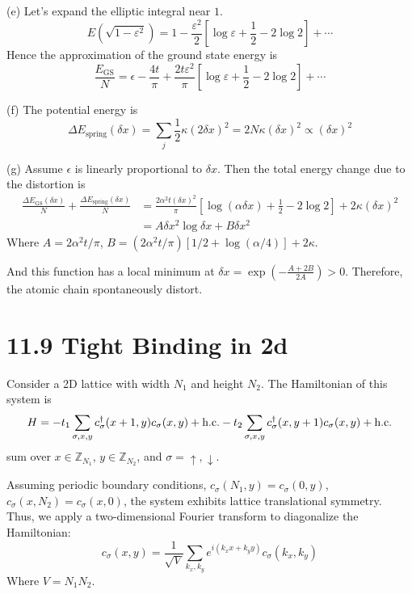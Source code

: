 \documentclass[a4paper,11pt]{article}
\begin{document}
(e) Let's expand the elliptic integral near $1$. 
\begin{equation}
    E\left(\sqrt{1-\varepsilon^2}\right)=1-\frac{\varepsilon^2}{2}\left[\log \varepsilon+\frac{1}{2}-2\log 2\right] + \cdots
\end{equation}
Hence the approximation of the ground state energy is
\begin{equation}
     \frac{E_\text{GS}}{N}=\epsilon-\frac{4t}{\pi}+\frac{2t\varepsilon^2}{\pi}\left[\log \varepsilon+\frac{1}{2}-2\log 2\right] + \cdots
\end{equation}


(f) The potential energy is 
\begin{equation}
    \Delta E_\text{spring}(\delta x)=\sum_{j} \frac{1}{2} \kappa(2\delta x)^2=2N\kappa(\delta x)^2\propto (\delta x)^2
\end{equation}

(g) Assume $\epsilon$ is linearly proportional to $\delta x$.
Then the total energy change due to the distortion is
\begin{align}
    \frac{\Delta E_\text{GS}(\delta x)}{N} + \frac{\Delta E_\text{spring}(\delta x)}{N} 
    &= \frac{2\alpha ^2t(\delta x)^2}{\pi}\left[\log (\alpha\delta x)+\frac{1}{2}-2\log 2\right] + 2\kappa (\delta x)^2 \\
    &=A\delta x^2\log\delta x + B\delta x^2
\end{align}
Where $A=2\alpha^2 t/\pi$, $B=(2\alpha^2 t/\pi)[1/2 +\log (\alpha/4)] + 2\kappa$.

And this function has a local minimum at $\delta x=\exp\left(-\frac{A+2B}{2A}\right) > 0$. Therefore, the atomic chain spontaneously distort.




\section{11.9 Tight Binding in 2d}



Consider a 2D lattice with width $N_1$ and height $N_2$. The Hamiltonian of this system is
\begin{equation}
    H=-t_1\sum_{\sigma, x, y}c_\sigma^\dagger(x + 1, y)c_\sigma(x, y)+\text{h.c.}-t_2\sum_{\sigma, x, y}c_\sigma^\dagger(x, y+1)c_\sigma(x, y)+\text{h.c.} 
\end{equation}
sum over $x\in \mathbb Z_{N_1}$, $y\in \mathbb Z_{N_2}$, and $\sigma=\uparrow, \downarrow$.

Assuming periodic boundary conditions, $c_\sigma(N_1, y)=c_\sigma(0, y)$, $c_\sigma(x, N_2)=c_\sigma(x, 0)$, the system exhibits lattice translational symmetry. Thus, we apply a two-dimensional Fourier transform to diagonalize the Hamiltonian:
\begin{equation}
    c_\sigma(x, y) = \frac{1}{\sqrt{V}}\sum_{k_x, k_y}e^{i(k_xx + k_y y)}c_\sigma(k_x, k_y)
\end{equation}
Where $V=N_1N_2$.
\end{document}
